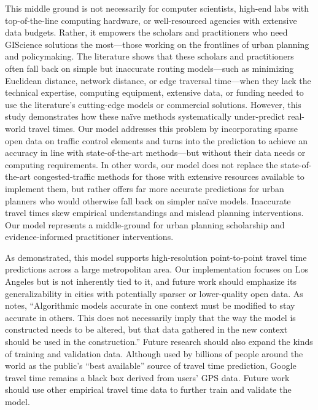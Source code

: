 \documentclass[12pt,letterpaper]{article} %
\begin{document}
This middle ground is not necessarily for computer scientists, high-end labs with top-of-the-line computing hardware, or well-resourced agencies with extensive data budgets. Rather, it empowers the scholars and practitioners who need GIScience solutions the most---those working on the frontlines of urban planning and policymaking. The literature shows that these scholars and practitioners often fall back on simple but inaccurate routing models---such as minimizing Euclidean distance, network distance, or edge traversal time---when they lack the technical expertise, computing equipment, extensive data, or funding needed to use the literature's cutting-edge models or commercial solutions. However, this study demonstrates how these naïve methods systematically under-predict real-world travel times. Our model addresses this problem by incorporating sparse open data on traffic control elements and turns into the prediction to achieve an accuracy in line with state-of-the-art methods---but without their data needs or computing requirements. In other words, our model does not replace the state-of-the-art congested-traffic methods for those with extensive resources available to implement them, but rather offers far more accurate predictions for urban planners who would otherwise fall back on simpler naïve models. Inaccurate travel times skew empirical understandings and mislead planning interventions. Our model represents a middle-ground for urban planning scholarship and evidence-informed practitioner interventions.

As demonstrated, this model supports high-resolution point-to-point travel time predictions across a large metropolitan area. Our implementation focuses on Los Angeles but is not inherently tied to it, and future work should emphasize its generalizability in cities with potentially sparser or lower-quality open data. As \citet[p. 230]{breiman2001statistical} notes, \enquote{Algorithmic models accurate in one context must be modified to stay accurate in others. This does not necessarily imply that the way the model is constructed needs to be altered, but that data gathered in the new context should be used in the construction.} Future research should also expand the kinds of training and validation data. Although used by billions of people around the world as the public's \enquote{best available} source of travel time prediction, Google travel time remains a black box derived from users' GPS data. Future work should use other empirical travel time data to further train and validate the model.
\end{document}
